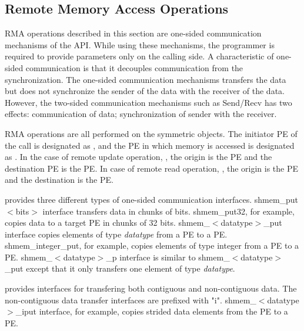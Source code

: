 
\subsection{Remote Memory Access Operations}
\ac{RMA} operations described in this section are one-sided communication
mechanisms of the \openshmem{} \ac{API}. While 
using these mechanisms, the programmer is required to provide parameters
only on the calling side. A characteristic of one-sided communication 
is that it decouples communication from
the synchronization. The one-sided communication mechanisms transfers 
the data but does not synchronize the sender of the data with the receiver
of the data. However, the two-sided communication mechanisms such as Send/Recv has two effects: 
communication of data; synchronization of sender with the receiver.

\openshmem{} \ac{RMA} operations are all performed on the symmetric objects. 
The initiator \ac{PE} of the call is designated as \source{}, and the 
\ac{PE} in which memory is accessed is designated as \target{}. In the case of remote
update operation, \PUT{}, the origin is the \source{} \ac{PE} and the 
destination \ac{PE} is the \target{} PE. In case of remote read operation, \GET{}, 
the origin is the \target{} \ac{PE} and the destination is the \source{} \ac{PE}.

\openshmem{} provides three different types of one-sided communication interfaces. 
shmem\_put$<$bits$>$ interface transfers data in chunks 
of bits. shmem\_put32, for example, copies data to a target \ac{PE} in chunks of 
32 bits. shmem\_$<$datatype$>$\_put interface copies elements of type 
\textit{datatype} from a \source{} \ac{PE} to a \target{} \ac{PE}. 
shmem\_integer\_put, for example, copies elements
of type integer from a \source{} \ac{PE} to a \target{} \ac{PE}. 
shmem\_$<$datatype$>$\_p interface is similar to shmem\_$<$datatype$>$\_put 
except that it only transfers one element of type \textit{datatype}.

\openshmem{} provides interfaces for transfering both contiguous and 
non-contiguous data. The non-contiguous data transfer interfaces are prefixed 
with "i". shmem\_$<$datatype$>$\_iput interface, for example, copies strided
data elements from the \source{} \ac{PE} to a \target{} \ac{PE}. 


